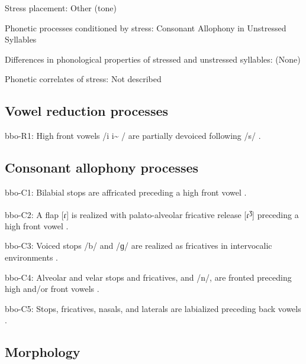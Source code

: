 {\begin{appendixdesc}
\item[Stress placement:] Other (tone)

\item[Phonetic processes conditioned by stress:] Consonant Allophony in Unstressed Syllables

\item[Differences in phonological properties of stressed and unstressed syllables:] (None)

\item[Phonetic correlates of stress:] Not described
\end{appendixdesc}
\subsection*{Vowel reduction processes}
\begin{appendixdesc}

\item[bbo-R1:] High front vowels /i i\~{} / are partially devoiced following /s/ \citep[28--29]{Morse1976}.
\end{appendixdesc}
\subsection*{Consonant allophony processes}
\begin{appendixdesc}

\item[bbo-C1:] Bilabial stops are affricated preceding a high front vowel \citep[20]{Morse1976}.

\item[bbo-C2:] A flap [ɾ] is realized with palato-alveolar fricative release [ɾ\textsuperscript{ʒ}] preceding a high front vowel \citep[25]{Morse1976}.

\item[bbo-C3:] Voiced stops /b/ and /ɡ/ are realized as fricatives in intervocalic environments \citep[22]{Morse1976}.

\item[bbo-C4:] Alveolar and velar stops and fricatives, and /n/, are fronted preceding high and/or front vowels \citep[20--23]{Morse1976}.

\item[bbo-C5:] Stops, fricatives, nasals, and laterals are labialized preceding back vowels \citep[20]{Morse1976}.
\end{appendixdesc}
\subsection*{Morphology}

}
